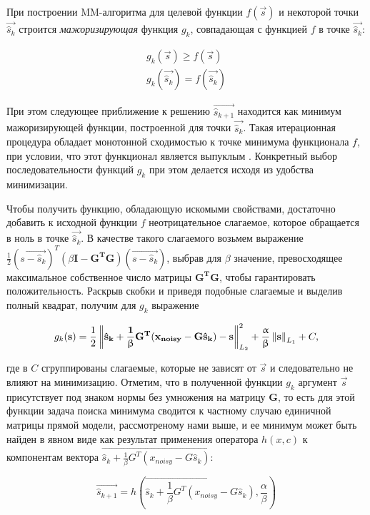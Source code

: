 При построении MM-алгоритма для целевой функции $f(\vec{s})$ и некоторой
точки $\vec{\hat{s}_k}$ строится \emph{мажоризирующая} функция $g_k$, совпадающая
с функцией $f$ в точке $\vec{\hat{s}_k}$:

\begin{gather*}
    g_k(\vec{s}) \geq f(\vec{s})\\
    g_k(\vec{\hat{s}_k}) = f(\vec{\hat{s}_k})
\end{gather*}

При этом следующее приближение к решению $\vec{\hat{s}_{k+1}}$ находится как
минимум мажоризирующей функции, построенной для точки $\vec{\hat{s}_k}$. Такая
итерационная процедура обладает монотонной сходимостью к точке минимума
функционала $f$, при условии, что этот функционал является выпуклым
\cite{combettes}.  Конкретный выбор последовательности функций $g_k$ при этом
делается исходя из удобства минимизации.

Чтобы получить функцию, обладающую искомыми свойствами, достаточно добавить к
исходной функции $f$ неотрицательное слагаемое, которое обращается в ноль в
точке $\vec{\hat{s}_k}$.  В качестве такого слагаемого возьмем выражение
$\frac{1}{2}(\vec{s - \hat{s}_k})^T (\beta\mathbf{I - G^TG})(\vec{s - \hat{s}_k})$,
выбрав для $\beta$ значение, превосходящее максимальное собственное число матрицы
$\mathbf{G^TG}$, чтобы гарантировать положительность. Раскрыв скобки и приведя подобные
слагаемые и выделив полный квадрат, получим для $g_k$ выражение

\begin{equation}
    g_k(\mathbf{s}) =
    \frac{1}{2}\left\lVert\mathbf{\hat{s}_k + \frac{1}{\upbeta} G^T(x_{noisy} - G \hat{s}_k) - s}\right\rVert^2_{L_2} + \frac{\upalpha}{\upbeta}\left\lVert\mathbf{s}\right\rVert_{L_1} + C,
\end{equation}

где в $C$ сгруппированы слагаемые, которые не зависят от $\vec{s}$ и
следовательно не влияют на минимизацию. Отметим, что в полученной функции
$g_k$ аргумент $\vec{s}$ присутствует под знаком нормы без умножения на
матрицу $\mathbf{G}$, то есть для этой функции задача поиска минимума сводится
к частному случаю единичной матрицы прямой модели, рассмотреному нами выше, и
ее минимум может быть найден в явном виде как результат применения оператора
$h(x, c)$ к компонентам вектора $\vec{\hat{s}_k + \frac{1}{\beta} G^T(x_{noisy} - G \hat{s}_k)}$:

\begin{equation}
    \vec{\hat{s}_{k+1}} = h\left(\vec{\hat{s}_k + \frac{1}{\beta} G^T(x_{noisy} - G \hat{s}_k)}, \frac{\alpha}{\beta}\right)
    \label{eq:fista_next_iter_soft_thresh}
\end{equation}

